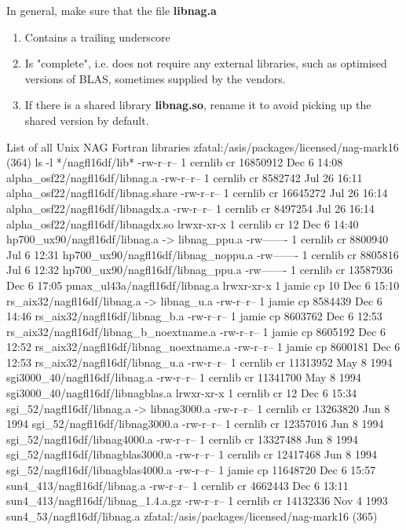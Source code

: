 In general, make sure that the file {\bf libnag.a}

\begin{enumerate}
\item
Contains a trailing underscore
\item
Is "complete", i.e. does not require any external libraries,
such as optimised versions of BLAS, sometimes supplied by the 
vendors.
\item
If there is a shared library {\bf libnag.so}, rename it to
avoid picking up the shared version by default.
\end{enumerate}

\begin{XMPt}{List of all Unix NAG Fortran libraries}
zfatal:/asis/packages/licensed/nag-mark16 (364) ls -l */nagfl16df/lib*
-rw-r--r--   1 cernlib  cr       16850912 Dec  6 14:08 alpha_osf22/nagfl16df/libnag.a
-rw-r--r--   1 cernlib  cr       8582742 Jul 26 16:11 alpha_osf22/nagfl16df/libnag.share
-rw-r--r--   1 cernlib  cr       16645272 Jul 26 16:14 alpha_osf22/nagfl16df/libnagdx.a
-rw-r--r--   1 cernlib  cr       8497254 Jul 26 16:14 alpha_osf22/nagfl16df/libnagdx.so
lrwxr-xr-x   1 cernlib  cr            12 Dec  6 14:40 hp700_ux90/nagfl16df/libnag.a -> libnag_ppu.a
-rw-------   1 cernlib  cr       8800940 Jul  6 12:31 hp700_ux90/nagfl16df/libnag_noppu.a
-rw-------   1 cernlib  cr       8805816 Jul  6 12:32 hp700_ux90/nagfl16df/libnag_ppu.a
-rw-------   1 cernlib  cr       13587936 Dec  6 17:05 pmax_ul43a/nagfl16df/libnag.a
lrwxr-xr-x   1 jamie    cp            10 Dec  6 15:10 rs_aix32/nagfl16df/libnag.a -> libnag_u.a
-rw-r--r--   1 jamie    cp       8584439 Dec  6 14:46 rs_aix32/nagfl16df/libnag_b.a
-rw-r--r--   1 jamie    cp       8603762 Dec  6 12:53 rs_aix32/nagfl16df/libnag_b_noextname.a
-rw-r--r--   1 jamie    cp       8605192 Dec  6 12:52 rs_aix32/nagfl16df/libnag_noextname.a
-rw-r--r--   1 jamie    cp       8600181 Dec  6 12:53 rs_aix32/nagfl16df/libnag_u.a
-rw-r--r--   1 cernlib  cr       11313952 May  8 1994  sgi3000_40/nagfl16df/libnag.a
-rw-r--r--   1 cernlib  cr       11341700 May  8 1994  sgi3000_40/nagfl16df/libnagblas.a
lrwxr-xr-x   1 cernlib  cr            12 Dec  6 15:34 sgi_52/nagfl16df/libnag.a -> libnag3000.a
-rw-r--r--   1 cernlib  cr       13263820 Jun  8 1994  sgi_52/nagfl16df/libnag3000.a
-rw-r--r--   1 cernlib  cr       12357016 Jun  8 1994  sgi_52/nagfl16df/libnag4000.a
-rw-r--r--   1 cernlib  cr       13327488 Jun  8 1994  sgi_52/nagfl16df/libnagblas3000.a
-rw-r--r--   1 cernlib  cr       12417468 Jun  8 1994  sgi_52/nagfl16df/libnagblas4000.a
-rw-r--r--   1 jamie    cp       11648720 Dec  6 15:57 sun4_413/nagfl16df/libnag.a
-rw-r--r--   1 cernlib  cr       4662443 Dec  6 13:11 sun4_413/nagfl16df/libnag_1.4.a.gz
-rw-r--r--   1 cernlib  cr       14132336 Nov  4 1993  sun4_53/nagfl16df/libnag.a
zfatal:/asis/packages/licensed/nag-mark16 (365) 
\end{XMPt}

